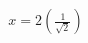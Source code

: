 \documentclass[preview]{standalone}
\begin{document}
\begin{align*}
x = 2\left(\frac{1}{\sqrt{2}}\right)
\end{align*}
\end{document}

